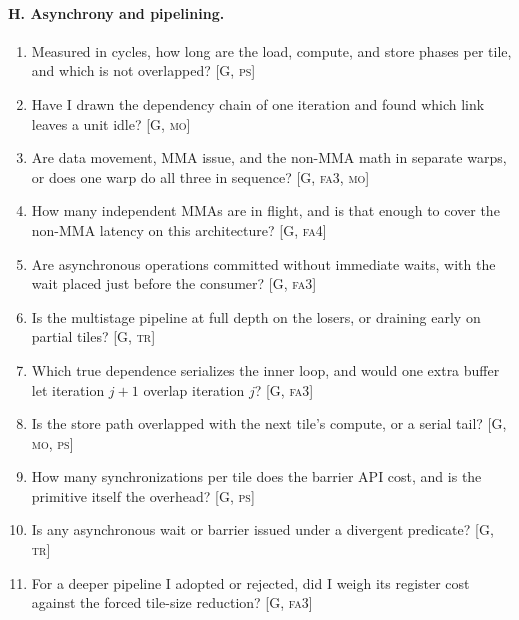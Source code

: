 \paragraph{H. Asynchrony and pipelining.}
\begin{enumerate}[nosep,leftmargin=*,resume]
\item Measured in cycles, how long are the load, compute, and store phases per tile, and which is not overlapped? [G, \textsc{ps}]
\item Have I drawn the dependency chain of one iteration and found which link leaves a unit idle? [G, \textsc{mo}]
\item Are data movement, MMA issue, and the non-MMA math in separate warps, or does one warp do all three in sequence? [G, \textsc{fa3}, \textsc{mo}]
\item How many independent MMAs are in flight, and is that enough to cover the non-MMA latency on this architecture? [G, \textsc{fa4}]
\item Are asynchronous operations committed without immediate waits, with the wait placed just before the consumer? [G, \textsc{fa3}]
\item Is the multistage pipeline at full depth on the losers, or draining early on partial tiles? [G, \textsc{tr}]
\item Which true dependence serializes the inner loop, and would one extra buffer let iteration $j{+}1$ overlap iteration $j$? [G, \textsc{fa3}]
\item Is the store path overlapped with the next tile's compute, or a serial tail? [G, \textsc{mo}, \textsc{ps}]
\item How many synchronizations per tile does the barrier API cost, and is the primitive itself the overhead? [G, \textsc{ps}]
\item Is any asynchronous wait or barrier issued under a divergent predicate? [G, \textsc{tr}]
\item For a deeper pipeline I adopted or rejected, did I weigh its register cost against the forced tile-size reduction? [G, \textsc{fa3}]
\end{enumerate}

